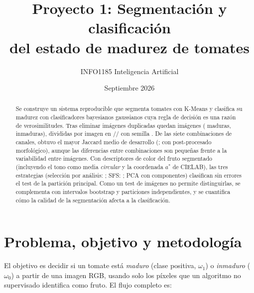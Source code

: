 \documentclass[11pt,a4paper]{article}
\title{\textbf{Proyecto 1: Segmentación y clasificación\\del estado de madurez de tomates}}
\author{INFO1185 Inteligencia Artificial}
\date{Septiembre 2026}
\begin{document}
\maketitle

\begin{abstract}
Se construye un sistema reproducible que segmenta tomates con K-Means y clasifica su
madurez con clasificadores bayesianos gaussianos cuya regla de decisión es una razón de
verosimilitudes. Tras eliminar \NDuplicates{} imágenes duplicadas quedan \NImages{}
imágenes (\NRipe{} maduras, \NUnripe{} inmaduras), divididas por imagen en
\NTrain/\NVal/\NTest{} con semilla \Seed. De las siete combinaciones de canales, \BestCombo{}
obtuvo el mayor Jaccard medio de desarrollo (\BestDevJ; \BestDevPostJ{} con post-procesado
morfológico), aunque las diferencias entre combinaciones son pequeñas frente a la
variabilidad entre imágenes. Con descriptores de color del fruto segmentado (incluyendo el
tono como media \emph{circular} y la coordenada $a^*$ de CIELAB), las tres estrategias
(selección por análisis: \AnalysisFeatures; SFS: \SFSFeatures; PCA con \PCAn{} componentes)
clasifican sin errores el test de la partición principal. Como un test de \NTest{} imágenes no
permite distinguirlas, se complementa con intervalos bootstrap y \NRepeats{} particiones
independientes, y se cuantifica cómo la calidad de la segmentación afecta a la clasificación.
\end{abstract}

\tableofcontents
\newpage

\section{Problema, objetivo y metodología}

El objetivo es decidir si un tomate está \emph{maduro} (clase positiva, $\omega_1$) o
\emph{inmaduro} ($\omega_0$) a partir de una imagen RGB, usando solo los píxeles que un
algoritmo no supervisado identifica como fruto. El flujo completo es:

\begin{center}
\end{center}
\end{document}
